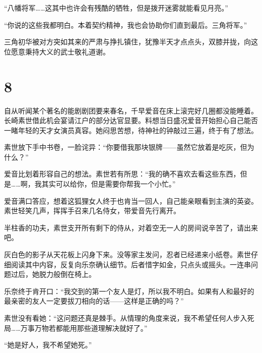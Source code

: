 \documentclass{article}
\begin{document}
“八幡将军……这其中也许会有残酷的牺牲，但是拨开迷雾就能看见月亮。”



“你说的这些我都明白。本着契约精神，我也会协助你们直到最后。三角将军。”



三角初华被对方突如其来的严肃与挣扎镇住，犹豫半天才点点头，双膝并拢，向这位愿意秉持大义的武士敬礼道谢。





{\centering\section*{8}}





自从听闻某个著名的能剧剧团要来春名，千早爱音在床上滚完好几圈都没能睡着。长崎素世借此机会宴请江户的部分达官显要。料想当日盛况爱音开始担心自己能否一睹年轻的天才女演员真容。她闷思苦想，待神社的钟敲过三遍，终于有了想法。



素世放下手中书卷，一脸诧异：“你要借我那块银牌——虽然它放着是吃灰，但为什么？”



爱音比划着形容自己的想法。素世若有所思：“我的确不喜欢去看这些东西，但是……啊，我其实可以给你，但是需要你帮我一个小忙。”



爱音满口答应，想着这狐狸女人终于也肯当一回人，自己能亲眼看到主演的英姿。素世轻笑几声，挥挥手召来几名侍女，带爱音先行离开。



半柱香的功夫，素世支开所有剩下的侍从，对着空无一人的房间说辛苦了，请出来吧。



灰白色的影子从天花板上闪身下来。没等家主发问，忍者已经递来小纸卷。素世仔细阅读其中内容，反复向乐奈确认细节。后者惜字如金，只点头或摇头。一连串问题过后，她脱力般倒在椅上。



乐奈终于肯开口：“我交到的第一个友人是灯，所以我不明白。如果有人和最好的最亲密的友人一定要拔刀相向的话——这样是正确的吗？”



素世没有看她：“这问题还真是棘手。从情理的角度来说，我不希望任何人步入死局……万事万物若都能用那些道理解决就好了。”



“她是好人，我不希望她死。”
\end{document}
